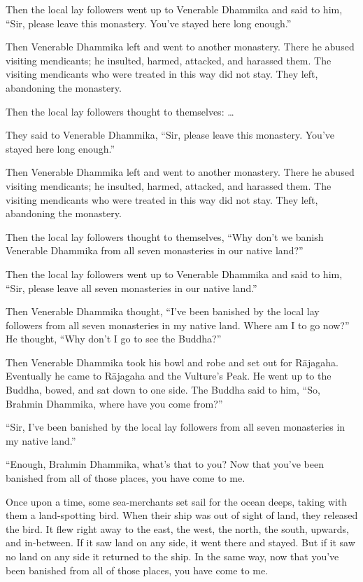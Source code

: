 \documentclass[12pt,openany]{book}%
\begin{document}
Then the local lay followers went up to Venerable Dhammika and said to him, “Sir, please leave this monastery. You’ve stayed here long enough.” 

Then Venerable Dhammika left and went to another monastery. There he abused visiting mendicants; he insulted, harmed, attacked, and harassed them. The visiting mendicants who were treated in this way did not stay. They left, abandoning the monastery. 

Then the local lay followers thought to themselves: … 

They said to Venerable Dhammika, “Sir, please leave this monastery. You’ve stayed here long enough.” 

Then Venerable Dhammika left and went to another monastery. There he abused visiting mendicants; he insulted, harmed, attacked, and harassed them. The visiting mendicants who were treated in this way did not stay. They left, abandoning the monastery. 

Then the local lay followers thought to themselves, “Why don’t we banish Venerable Dhammika from all seven monasteries in our native land?” 

Then the local lay followers went up to Venerable Dhammika and said to him, “Sir, please leave all seven monasteries in our native land.” 

Then Venerable Dhammika thought, “I’ve been banished by the local lay followers from all seven monasteries in my native land. Where am I to go now?” He thought, “Why don’t I go to see the Buddha?” 

Then Venerable Dhammika took his bowl and robe and set out for \textsanskrit{Rājagaha}. Eventually he came to \textsanskrit{Rājagaha} and the Vulture’s Peak. He went up to the Buddha, bowed, and sat down to one side. The Buddha said to him, “So, Brahmin Dhammika, where have you come from?” 

“Sir, I’ve been banished by the local lay followers from all seven monasteries in my native land.” 

“Enough, Brahmin Dhammika, what’s that to you? Now that you’ve been banished from all of those places, you have come to me. 

Once upon a time, some sea-merchants set sail for the ocean deeps, taking with them a land-spotting bird. When their ship was out of sight of land, they released the bird. It flew right away to the east, the west, the north, the south, upwards, and in-between. If it saw land on any side, it went there and stayed. But if it saw no land on any side it returned to the ship. In the same way, now that you’ve been banished from all of those places, you have come to me. 
\end{document}
